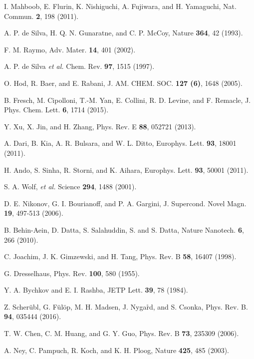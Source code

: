 \documentclass[doublecol]{epl2}
\begin{document}
\begin{thebibliography}{0}

 I. Mahboob, E. Flurin, K. Nishiguchi, A. Fujiwara,
and H. Yamaguchi,  Nat. Commun. \textbf{2}, 198 (2011).

 A. P. de Silva, H. Q. N. Gunaratne, and C. P. McCoy,
Nature \textbf{364}, 42 (1993).

 F. M. Raymo, Adv. Mater. \textbf{14}, 401 (2002).

 A. P. de Silva {\it et al.} Chem. Rev. \textbf{97},
1515 (1997).

 O. Hod, R. Baer, and E. Rabani, J. AM. CHEM. SOC.
\textbf{127 (6)}, 1648 (2005).

 B. Fresch, M. Cipolloni, T.-M. Yan, E. Collini, R. D.
Levine, and F. Remacle, J. Phys. Chem. Lett. \textbf{6}, 1714 (2015).

 Y. Xu, X. Jin, and H. Zhang, Phys. Rev. E \textbf{88},
052721 (2013).

 A. Dari, B. Kia, A. R. Bulsara, and W. L. Ditto, Europhys.
Lett. \textbf{93}, 18001 (2011).

 H. Ando, S. Sinha, R. Storni, and K. Aihara, Europhys.
Lett. \textbf{93}, 50001 (2011).

 S. A. Wolf, {\it et al.} Science \textbf{294},
1488 (2001).

 D. E. Nikonov, G. I. Bourianoff, and P. A. Gargini,
J. Supercond. Novel Magn. \textbf{19}, 497-513 (2006).

 B. Behin-Aein, D. Datta, S. Salahuddin, S. and S.
Datta, Nature Nanotech. \textbf{6}, 266 (2010).

 C. Joachim, J. K. Gimzewski, and H. Tang, Phys. Rev. B
\textbf{58}, 16407 (1998).

 G. Dresselhaus, Phys. Rev. \textbf{100}, 580 (1955).

 Y. A. Bychkov and E. I. Rashba, JETP Lett. \textbf{39},
78 (1984).

 Z. Scher\"ubl, G. F\"ul\"op, M. H. Madsen, J. Nyga\r{r}d,
and S. Csonka, Phys. Rev. B. \textbf{94}, 035444 (2016).

 T. W. Chen, C. M. Huang, and G. Y. Guo, Phys. Rev. B
\textbf{73}, 235309 (2006).

 A. Ney, C. Pampuch, R. Koch, and K. H. Ploog,
Nature \textbf{425}, 485 (2003).


\end{thebibliography}
\end{document}
